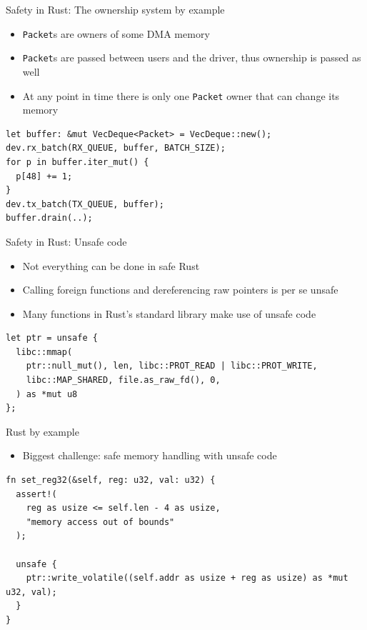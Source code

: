 \documentclass[NET,english,aspectratio=169,notitleframe]{tumbeamer}
\begin{document}
\begin{frame}[fragile]{Safety in Rust: The ownership system by example}
\begin{itemize}
\item \texttt{Packet}s are owners of some DMA memory
\item \texttt{Packet}s are passed between users and the driver, thus ownership is passed as well
\item At any point in time there is only one \texttt{Packet} owner that can change its memory
\end{itemize}
\begin{verbatim}
let buffer: &mut VecDeque<Packet> = VecDeque::new();
dev.rx_batch(RX_QUEUE, buffer, BATCH_SIZE);
for p in buffer.iter_mut() {
  p[48] += 1;
}
dev.tx_batch(TX_QUEUE, buffer);
buffer.drain(..);
\end{verbatim}
\end{frame}

\begin{frame}[fragile]{Safety in Rust: Unsafe code}
\begin{itemize}
\item Not everything can be done in safe Rust
\item Calling foreign functions and dereferencing raw pointers is per se unsafe
\item Many functions in Rust's standard library make use of unsafe code
\end{itemize}
\begin{verbatim}
let ptr = unsafe {
  libc::mmap(
    ptr::null_mut(), len, libc::PROT_READ | libc::PROT_WRITE,
    libc::MAP_SHARED, file.as_raw_fd(), 0,
  ) as *mut u8
};
\end{verbatim}
\end{frame}

\begin{frame}[fragile]{Rust by example}
\begin{itemize}
\item Biggest challenge: safe memory handling with unsafe code
\end{itemize}
\begin{verbatim}
fn set_reg32(&self, reg: u32, val: u32) {
  assert!(
    reg as usize <= self.len - 4 as usize,
    "memory access out of bounds"
  );

  unsafe {
    ptr::write_volatile((self.addr as usize + reg as usize) as *mut u32, val);
  }
}
\end{verbatim}
\end{frame}
\end{document}
